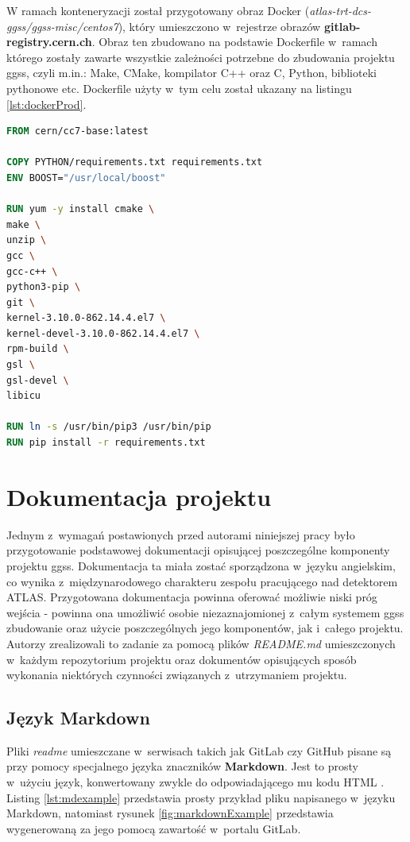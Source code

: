 \newpage

W ramach konteneryzacji został przygotowany obraz Docker (\textit{atlas-trt-dcs-ggss/ggss-misc/centos7}), który umieszczono w~rejestrze obrazów \textbf{gitlab-registry.cern.ch}. Obraz ten zbudowano na podstawie Dockerfile w~ramach którego zostały zawarte wszystkie zależności potrzebne do zbudowania projektu \gls*{ggss}, czyli m.in.: Make, CMake, kompilator C++ oraz C, Python, biblioteki pythonowe etc. Dockerfile użyty w~tym celu został ukazany na listingu \ref{lst:dockerProd}.

\begin{lstlisting}[language=Dockerfile, caption={Dockerfile dla projektu \gls*{ggss}}, label={lst:dockerProd}]
FROM cern/cc7-base:latest

COPY PYTHON/requirements.txt requirements.txt
ENV BOOST="/usr/local/boost"

RUN yum -y install cmake \
make \
unzip \
gcc \
gcc-c++ \
python3-pip \
git \
kernel-3.10.0-862.14.4.el7 \
kernel-devel-3.10.0-862.14.4.el7 \
rpm-build \
gsl \
gsl-devel \
libicu

RUN ln -s /usr/bin/pip3 /usr/bin/pip
RUN pip install -r requirements.txt
\end{lstlisting}

\newpage
\section{Dokumentacja projektu}
Jednym z~wymagań postawionych przed autorami niniejszej pracy było przygotowanie podstawowej dokumentacji opisującej poszczególne komponenty projektu \gls*{ggss}. Dokumentacja ta miała zostać sporządzona w~języku angielskim, co wynika z~międzynarodowego charakteru zespołu pracującego nad detektorem ATLAS. Przygotowana dokumentacja powinna oferować możliwie niski próg wejścia - powinna ona umożliwić osobie niezaznajomionej z~całym systemem \gls*{ggss} zbudowanie oraz użycie poszczególnych jego komponentów, jak i~całego projektu. Autorzy zrealizowali to zadanie za pomocą plików \textit{README.md} umieszczonych w~każdym repozytorium projektu oraz dokumentów opisujących sposób wykonania niektórych czynności związanych z~utrzymaniem projektu.

\subsection{Język Markdown}
Pliki \textit{readme} umieszczane w~serwisach takich jak GitLab czy GitHub pisane są przy pomocy specjalnego języka znaczników \textbf{Markdown}. Jest to prosty w~użyciu język, konwertowany zwykle do odpowiadającego mu kodu HTML \cite{Markdown1}. Listing \ref{lst:mdexample} przedstawia prosty przykład pliku napisanego w~języku Markdown, natomiast rysunek \ref{fig:markdownExample} przedstawia wygenerowaną za jego pomocą zawartość w~portalu GitLab.


